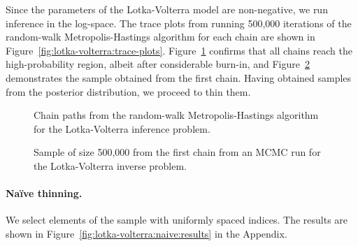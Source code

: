 \documentclass[11pt,a4paper]{report}
\begin{document}
Since the parameters of the Lotka-Volterra model are non-negative, we run inference in the log-space. The trace plots from running 500,000 iterations of the random-walk Metropolis-Hastings algorithm for each chain are shown in Figure~\ref{fig:lotka-volterra:trace-plots}. Figure~\ref{fig:lotka-volterra:chain-paths} confirms that all chains reach the high-probability region, albeit after considerable burn-in, and Figure~\ref{fig:lotka-volterra:chain1-sample} demonstrates the sample obtained from the first chain. Having obtained samples from the posterior distribution, we proceed to thin them.

\begin{figure}[h]
\centering
{}
\caption{Chain paths from the random-walk Metropolis-Hastings algorithm for the Lotka-Volterra inference problem.
\label{fig:lotka-volterra:chain-paths}}
\end{figure}

\begin{figure}[h]
\centering
{}
\caption{Sample of size 500,000 from the first chain from an MCMC run for the Lotka-Volterra inverse problem.
\label{fig:lotka-volterra:chain1-sample}}
\end{figure}

\paragraph{Na\"ive thinning.} We select elements of the sample with uniformly spaced indices. The results are shown in Figure~\ref{fig:lotka-volterra:naive:results} in the Appendix.
\end{document}
